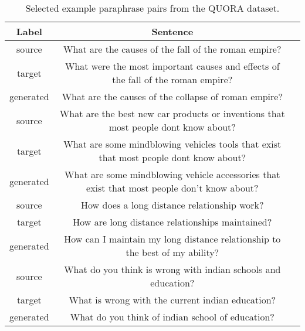 \begin{table}
\begin{adjustbox}{width=1\textwidth}
 \begin{tabular}{||c c c||} 
 \hline
 Label & Sentence & \\ [0.5ex] 
 \hline
 source & What are the causes of the fall of the roman empire? &  \\
 \hline
 target & What were the most important causes and effects of the fall of the roman empire? &  \\
 \hline
 generated & What are the causes of the collapse of roman empire? & \\
 \hline
 source & What are the best new car products or inventions that most people dont know about? &  \\
 \hline
 target & What are some mindblowing vehicles tools that exist that most people dont know about? & \\
 \hline
 generated & What are some mindblowing vehicle accessories that exist that most people don't know about? &  \\
 \hline
 source & How does a long distance relationship work? &  \\
 \hline
 target & How are long distance relationships maintained? &  \\
 \hline
 generated & How can I maintain my long distance relationship to the best of my ability? &  \\
 \hline
 source & What do you think is wrong with indian schools and education? &  \\
 \hline
 target & What is wrong with the current indian education? &  \\
 \hline
 generated & What do you think of indian school of education? &  \\
 \hline
\end{tabular}
\end{adjustbox}
\caption{Selected example paraphrase pairs from the QUORA dataset.}
\end{table}


